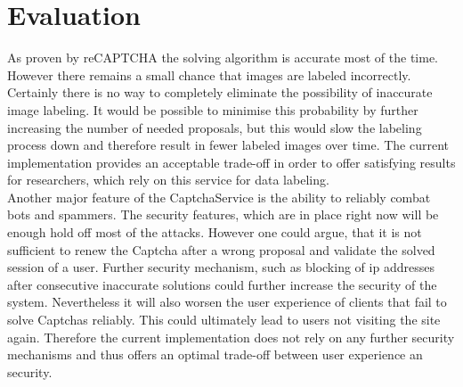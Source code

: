 \section{Evaluation}
\label{sec:evaluation}

As proven by reCAPTCHA the solving algorithm is accurate most of the time. However there remains a small chance that images are labeled incorrectly. Certainly there is no way to completely eliminate the possibility of inaccurate image labeling. It would be possible to minimise this probability by further increasing the number of needed proposals, but this would slow the labeling process down and therefore result in fewer labeled images over time. The current implementation provides an acceptable trade-off in order to offer satisfying results for researchers, which rely on this service for data labeling. \\

Another major feature of the CaptchaService is the ability to reliably combat bots and spammers. The security features, which are in place right now will be enough hold off most of the attacks. However one could argue, that it is not sufficient to renew the Captcha after a wrong proposal and validate the solved session of a user. Further security mechanism, such as blocking of ip addresses after consecutive inaccurate solutions could further increase the security of the system. Nevertheless it will also worsen the user experience of clients that fail to solve Captchas reliably. This could ultimately lead to users not visiting the site again. Therefore the current implementation does not rely on any further security mechanisms and thus offers an optimal trade-off between user experience an security.

\clearpage